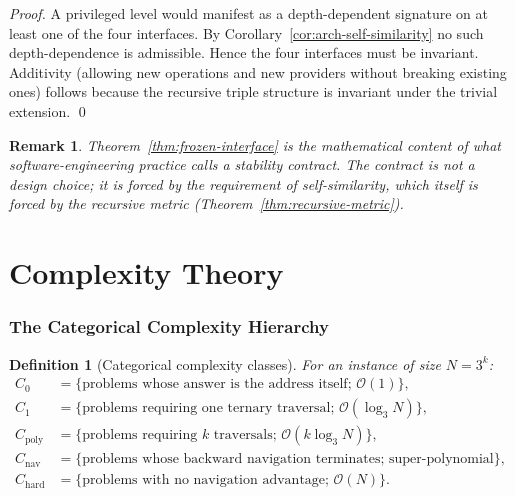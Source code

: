 \documentclass[twocolumn,a4paper]{article}
\newtheorem{definition}[theorem]{Definition}
\newtheorem{remark}[theorem]{Remark}
\begin{document}
\begin{proof}
A privileged level would manifest as a depth-dependent signature on at least one of the four interfaces. By Corollary~\ref{cor:arch-self-similarity} no such depth-dependence is admissible. Hence the four interfaces must be invariant. Additivity (allowing new operations and new providers without breaking existing ones) follows because the recursive triple structure is invariant under the trivial extension. \qed
\end{proof}

\begin{remark}
Theorem~\ref{thm:frozen-interface} is the mathematical content of what software-engineering practice calls a stability contract. The contract is not a design choice; it is forced by the requirement of self-similarity, which itself is forced by the recursive metric (Theorem~\ref{thm:recursive-metric}).
\end{remark}

\part{Complexity Theory}

\section{The Categorical Complexity Hierarchy}
\label{sec:cat-complexity}

\begin{definition}[Categorical complexity classes]
\label{def:cat-complexity}
For an instance of size $N=3^{k}$:
\begin{align*}
C_{0} &= \{\text{problems whose answer is the address itself; } \mathcal{O}(1)\},\\
C_{1} &= \{\text{problems requiring one ternary traversal; } \mathcal{O}(\log_{3}N)\},\\
C_{\text{poly}} &= \{\text{problems requiring }k\text{ traversals; } \mathcal{O}(k\log_{3}N)\},\\
C_{\text{nav}} &= \{\text{problems whose backward navigation terminates; super-polynomial}\},\\
C_{\text{hard}} &= \{\text{problems with no navigation advantage; } \mathcal{O}(N)\}.
\end{align*}
\end{definition}
\end{document}
